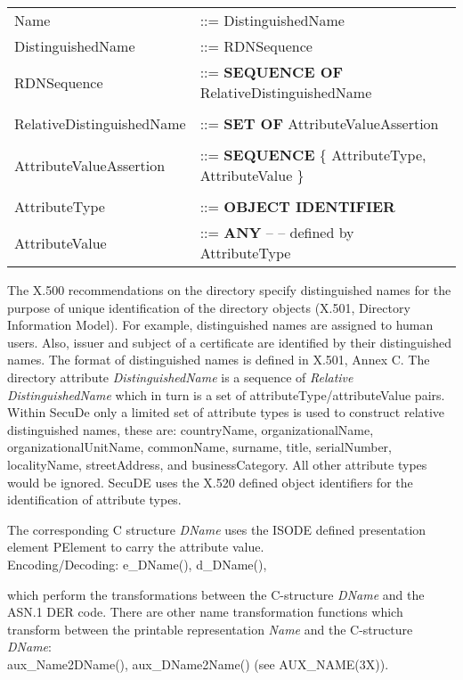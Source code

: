 {\small
\begin {center}
\begin {tabular}{ll}
Name & ::= DistinguishedName    \\
DistinguishedName & ::= RDNSequence              \\
RDNSequence  & ::= {\bf SEQUENCE OF} RelativeDistinguishedName \\
 & \\
RelativeDistinguishedName & ::= {\bf SET OF} AttributeValueAssertion \\
 & \\
AttributeValueAssertion   &
   ::= {\bf SEQUENCE} \{ AttributeType, AttributeValue \} \\
 & \\
AttributeType  &  ::= {\bf OBJECT IDENTIFIER} \\
AttributeValue &  ::= {\bf ANY} -- -- defined by AttributeType
\end {tabular}
\end {center}
}
The X.500 recommendations on the directory specify
distinguished names for the purpose of unique identification of the directory objects
(X.501, Directory Information Model).
For example, distinguished names are assigned to human users.
Also, issuer and subject of a certificate are identified by their distinguished names.
The format of distinguished names is defined in
X.501, Annex C.
The directory attribute {\em DistinguishedName} is a sequence of {\em Relative DistinguishedName}
which in turn is a set of attributeType/attributeValue pairs.
Within SecuDe
only a limited set of attribute types is used to construct relative distinguished names,
these are:
countryName, organizationalName, organizationalUnitName, commonName, surname,
title, serialNumber, localityName, streetAddress, and businessCategory.
All other attribute types would be ignored. SecuDE uses the X.520 defined object identifiers
for the identification of attribute types.

The corresponding C structure {\em DName} uses the ISODE defined presentation element
PElement to carry the attribute value. 
\\ [1em]
Encoding/Decoding: e\_DName(), d\_DName(),

which perform the transformations between the C-structure {\em DName} and the ASN.1 DER code.
There are other name transformation functions which transform between
the printable representation {\em Name} and the C-structure {\em DName}: \\
aux\_Name2DName(), aux\_DName2Name() (see AUX\_NAME(3X)).


